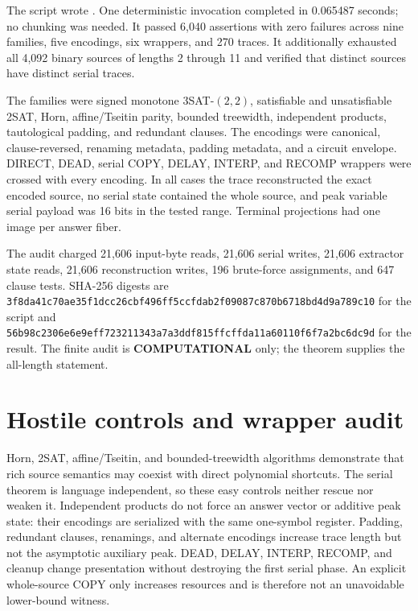 \documentclass[11pt]{article}
\newcommand{\COMP}{\textbf{COMPUTATIONAL}}
\begin{document}
The script
wrote
.
One deterministic invocation completed in 0.065487 seconds; no chunking was
needed.  It passed 6,040 assertions with zero failures across nine families,
five encodings, six wrappers, and 270 traces.  It additionally exhausted all
4,092 binary sources of lengths 2 through 11 and verified that distinct
sources have distinct serial traces.

The families were signed monotone $3$SAT-$(2,2)$, satisfiable and
unsatisfiable 2SAT, Horn, affine/Tseitin parity, bounded treewidth,
independent products, tautological padding, and redundant clauses.  The
encodings were canonical, clause-reversed, renaming metadata, padding
metadata, and a circuit envelope.  DIRECT, DEAD, serial COPY, DELAY, INTERP,
and RECOMP wrappers were crossed with every encoding.  In all cases the trace
reconstructed the exact encoded source, no serial state contained the whole
source, and peak variable serial payload was 16 bits in the tested range.
Terminal projections had one image per answer fiber.

The audit charged 21,606 input-byte reads, 21,606 serial writes, 21,606
extractor state reads, 21,606 reconstruction writes, 196 brute-force
assignments, and 647 clause tests.  SHA-256 digests are
\nolinkurl{3f8da41c70ae35f1dcc26cbf496ff5ccfdab2f09087c870b6718bd4d9a789c10}
for the script and
\nolinkurl{56b98c2306e6e9eff723211343a7a3ddf815ffcffda11a60110f6f7a2bc6dc9d}
for the result.  The finite audit is \COMP{} only; the theorem supplies the
all-length statement.

\section{Hostile controls and wrapper audit}

Horn, 2SAT, affine/Tseitin, and bounded-treewidth algorithms demonstrate that
rich source semantics may coexist with direct polynomial shortcuts.  The
serial theorem is language independent, so these easy controls neither rescue
nor weaken it.  Independent products do not force an answer vector or
additive peak state: their encodings are serialized with the same one-symbol
register.  Padding, redundant clauses, renamings, and alternate encodings
increase trace length but not the asymptotic auxiliary peak.  DEAD, DELAY,
INTERP, RECOMP, and cleanup change presentation without destroying the first
serial phase.  An explicit whole-source COPY only increases resources and is
therefore not an unavoidable lower-bound witness.
\end{document}
